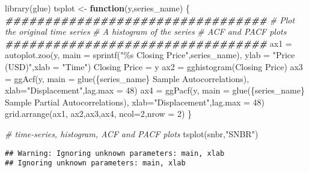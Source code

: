 \documentclass[
  10.5pt,
]{article}
\newenvironment{Shaded}{\begin{snugshade}}{\end{snugshade}}
\newcommand{\AttributeTok}[1]{\textcolor[rgb]{0.77,0.63,0.00}{#1}}
\newcommand{\CommentTok}[1]{\textcolor[rgb]{0.56,0.35,0.01}{\textit{#1}}}
\newcommand{\ControlFlowTok}[1]{\textcolor[rgb]{0.13,0.29,0.53}{\textbf{#1}}}
\newcommand{\DecValTok}[1]{\textcolor[rgb]{0.00,0.00,0.81}{#1}}
\newcommand{\DocumentationTok}[1]{\textcolor[rgb]{0.56,0.35,0.01}{\textbf{\textit{#1}}}}
\newcommand{\FunctionTok}[1]{\textcolor[rgb]{0.00,0.00,0.00}{#1}}
\newcommand{\NormalTok}[1]{#1}
\newcommand{\OtherTok}[1]{\textcolor[rgb]{0.56,0.35,0.01}{#1}}
\newcommand{\StringTok}[1]{\textcolor[rgb]{0.31,0.60,0.02}{#1}}
\begin{document}
\begin{Shaded}
\begin{Highlighting}[]
\FunctionTok{library}\NormalTok{(glue)}
\NormalTok{tsplot }\OtherTok{\textless{}{-}} \ControlFlowTok{function}\NormalTok{(y,series\_name) \{}
  \DocumentationTok{\#\#\#\#\#\#\#\#\#\#\#\#\#\#\#\#\#\#\#\#\#\#\#\#\#\#\#\#\#\#\#\#\#}
  \CommentTok{\# Plot the original time series }
  \CommentTok{\# A histogram of the series     }
  \CommentTok{\# ACF and PACF plots}
  \DocumentationTok{\#\#\#\#\#\#\#\#\#\#\#\#\#\#\#\#\#\#\#\#\#\#\#\#\#\#\#\#\#\#\#\#\#}
\NormalTok{  ax1 }\OtherTok{=} \FunctionTok{autoplot.zoo}\NormalTok{(y, }\AttributeTok{main =} \FunctionTok{sprintf}\NormalTok{(}\StringTok{"\%s Closing Price"}\NormalTok{,series\_name),}
         \AttributeTok{ylab =} \StringTok{"Price (USD)"}\NormalTok{,}\AttributeTok{xlab =} \StringTok{"Time"}\NormalTok{)}
  \StringTok{\textasciigrave{}}\AttributeTok{Closing Price}\StringTok{\textasciigrave{}} \OtherTok{=}\NormalTok{ y}
\NormalTok{  ax2 }\OtherTok{=} \FunctionTok{gghistogram}\NormalTok{(}\StringTok{\textasciigrave{}}\AttributeTok{Closing Price}\StringTok{\textasciigrave{}}\NormalTok{)}
\NormalTok{  ax3 }\OtherTok{=} \FunctionTok{ggAcf}\NormalTok{(y,}
              \AttributeTok{main =} \FunctionTok{glue}\NormalTok{(}\StringTok{\textquotesingle{}\{series\_name\} Sample Autocorrelations\textquotesingle{}}\NormalTok{),}
              \AttributeTok{xlab=}\StringTok{"Displacement"}\NormalTok{,}\AttributeTok{lag.max =} \DecValTok{48}\NormalTok{)}
\NormalTok{  ax4 }\OtherTok{=} \FunctionTok{ggPacf}\NormalTok{(y,}
               \AttributeTok{main =} \FunctionTok{glue}\NormalTok{(}\StringTok{\textquotesingle{}\{series\_name\} Sample Partial Autocorrelations\textquotesingle{}}\NormalTok{),}
               \AttributeTok{xlab=}\StringTok{"Displacement"}\NormalTok{,}\AttributeTok{lag.max =} \DecValTok{48}\NormalTok{)}
  \FunctionTok{grid.arrange}\NormalTok{(ax1, ax2,ax3,ax4, }\AttributeTok{ncol=}\DecValTok{2}\NormalTok{,}\AttributeTok{nrow =} \DecValTok{2}\NormalTok{)}
\NormalTok{\}}

\CommentTok{\# time{-}series, histogram, ACF and PACF plots}
\FunctionTok{tsplot}\NormalTok{(snbr,}\StringTok{"SNBR"}\NormalTok{)}
\end{Highlighting}
\end{Shaded}

\begin{verbatim}
## Warning: Ignoring unknown parameters: main, xlab
## Ignoring unknown parameters: main, xlab
\end{verbatim}
\end{document}
